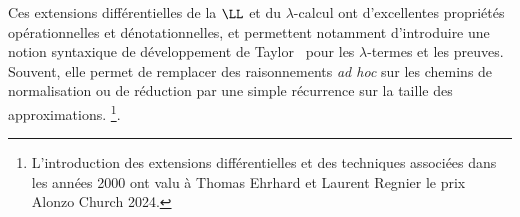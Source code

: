 \documentclass[a4]{article}
\begin{document}
Ces extensions différentielles de la $\LL$ et du $\lambda$-calcul ont
d'excellentes propriétés opérationnelles et dénotationnelles, et
permettent notamment d'introduire une notion syntaxique de
développement de Taylor~\cite{EhrhardRegnier06a} pour les $\lambda$-termes et
les preuves.
Souvent, elle permet de remplacer des raisonnements \emph{ad hoc} sur
les chemins de normalisation ou de réduction par une simple récurrence
sur la taille des approximations.
%
\footnote{L'introduction des extensions différentielles et des techniques
    associées dans les années 2000 ont valu à Thomas Ehrhard et Laurent Regnier
    le prix Alonzo Church 2024.}.




\end{document}
